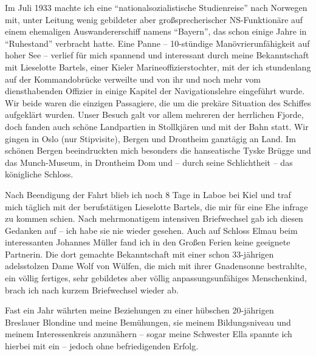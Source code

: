\documentclass[a5paper,pagesize,10pt,twoside=true]{scrbook}
\begin{document}
Im Juli 1933 machte ich eine \enquote{nationalsozialistische Studienreise} nach Norwegen mit, unter Leitung wenig gebildeter aber großsprecherischer NS-Funktionäre auf einem ehemaligen Auswandererschiff namens \enquote{Bayern}, das schon einige Jahre in \enquote{Ruhestand} verbracht hatte. Eine Panne -- 10-stündige Manövrierunfähigkeit auf hoher See -- verlief für mich spannend und interessant durch meine Bekanntschaft mit Lieselotte Bartels, einer Kieler Marineoffizierstochter, mit der ich stundenlang auf der Kommandobrücke verweilte und von ihr und noch mehr vom diensthabenden Offizier in einige Kapitel der Navigationslehre eingeführt wurde. Wir beide waren die einzigen Passagiere, die um die prekäre Situation des Schiffes aufgeklärt wurden. Unser Besuch galt vor allem mehreren der herrlichen Fjorde, doch fanden auch schöne Landpartien in Stollkjären und mit der Bahn statt. Wir gingen in Oslo (nur Stipvisite), Bergen und Drontheim ganztägig an Land. Im schönen Bergen beeindruckten mich besonders die hanseatische Tyske Brügge und das Munch-Museum, in Drontheim Dom und -- durch seine Schlichtheit -- das königliche Schloss.

Nach Beendigung der Fahrt blieb ich noch 8 Tage in Laboe bei Kiel und traf mich täglich mit der berufstätigen Lieselotte Bartels, die mir für eine Ehe infrage zu kommen schien. Nach mehrmonatigem intensiven Briefwechsel gab ich diesen Gedanken auf -- ich habe sie nie wieder gesehen. Auch auf Schloss Elmau beim interessanten Johannes Müller fand ich in den Großen Ferien keine geeignete Partnerin. Die dort gemachte Bekanntschaft mit einer schon 33-jährigen adelsstolzen Dame Wolf von Wülfen, die mich mit ihrer Gnadensonne bestrahlte, ein völlig fertiges, sehr gebildetes aber völlig anpassungsunfähiges Menschenkind, brach ich nach kurzem Briefwechsel wieder ab.

Fast ein Jahr währten meine Beziehungen zu einer hübschen 20-jährigen Breslauer Blondine und meine Bemühungen, sie meinem Bildungsniveau und meinem Interessenkreis anzunähern -- sogar meine Schwester Ella spannte ich hierbei mit ein -- jedoch ohne befriedigenden Erfolg.
\end{document}
